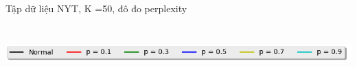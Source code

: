 \documentclass[pdf]{beamer}
\begin{document}
\begin{frame}{Tập dữ liệu NYT, K =50, đô đo perplexity}
\begin{columns}[T] %
	\begin{column}{.50\textwidth}
		\begin{figure}
		\end{figure}
	\end{column} %
	\hfill%
	\begin{column}{.50\textwidth}
		\begin{figure}
		\end{figure}				
	\end{column} %
\end{columns}
\begin{center}
	\includegraphics[width=1\textwidth]{menu.png}	
\end{center}
\end{frame}
\end{document}
